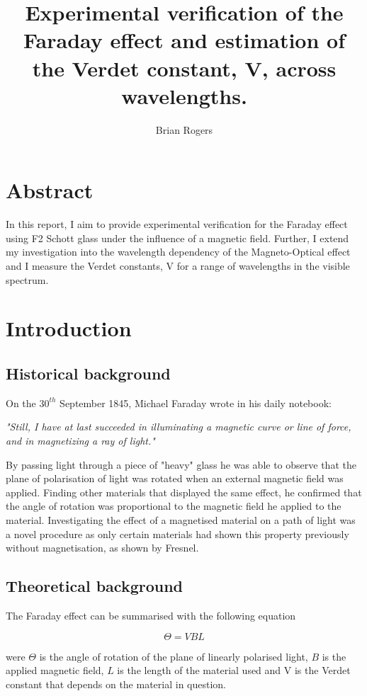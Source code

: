 \documentclass{article}%
\title{Experimental verification of the Faraday effect and estimation of the Verdet constant, V, across wavelengths.}%
\author{Brian Rogers}
\date{}%
\begin{document}
%
\maketitle
\section*{Abstract}
In this report, I aim to provide experimental verification for the Faraday effect using F2 Schott glass under the influence of a magnetic field.
Further, I extend my investigation into the wavelength dependency of the Magneto-Optical effect and I measure the Verdet constants, V for a range of wavelengths in the visible spectrum. 


\section{Introduction}
\subsection{Historical background}
On the $30^{th}$ September 1845, Michael Faraday wrote in his daily notebook:

\textit{
"Still, I have at last succeeded in illuminating a magnetic curve or line of force, and in magnetizing a ray of light."
} 
\cite{Faraday}

By passing light through a piece of "heavy" glass he was able to observe that the plane of polarisation of light was rotated when an external magnetic field was applied. 
Finding other materials that displayed the same effect, he confirmed that the angle of rotation
was proportional to the magnetic field he applied to the material. Investigating the effect of a magnetised material on a path of light was a novel procedure as only certain materials had shown this property previously without magnetisation, as shown by Fresnel. \cite{Fresnel} 



\subsection{Theoretical background}

The Faraday effect can be summarised with the following equation 

\begin{equation}
    \Theta = V B L
\end{equation}

were $\Theta$ is the angle of rotation of the plane of linearly polarised light, $B$ is the applied magnetic field, $L$ is the length of the material used and V is the Verdet constant that depends on the material in question.
\end{document}
